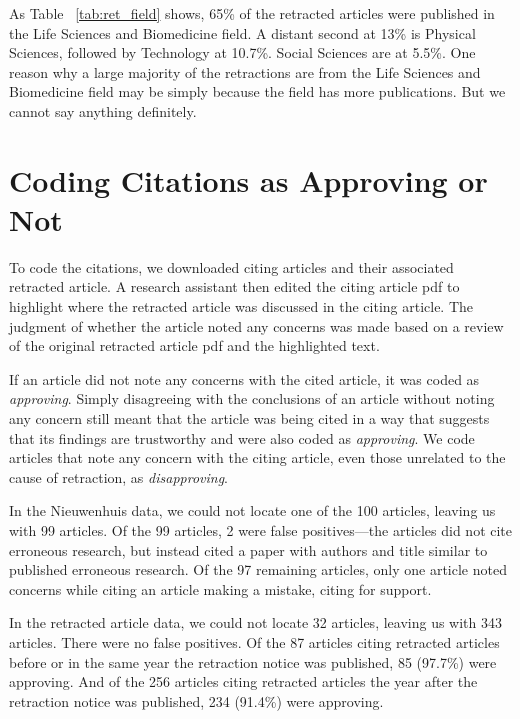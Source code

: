 \documentclass[12pt, letterpaper]{article}
\begin{document}
As Table ~\ref{tab:ret_field} shows, 65\% of the retracted articles were published in the Life Sciences and Biomedicine field.  A distant second at 13\% is Physical Sciences, followed by Technology at 10.7\%. Social Sciences are at 5.5\%.  One reason why a large majority of the retractions are from the  Life Sciences and Biomedicine field may be simply because the field has more publications. But we cannot say anything definitely.



\clearpage
\section{Coding Citations as Approving or Not}
\label{approving_or_not}

To code the citations, we downloaded citing articles and their associated retracted article. A research assistant then edited the citing article pdf to highlight where the retracted article was discussed in the citing article. The judgment of whether the article noted any concerns was made based on a review of the original retracted article pdf and the highlighted text. 

If an article did not note any concerns with the cited article, it was coded as \textit{approving}. Simply disagreeing with the conclusions of an article without noting any concern still meant that the article was being cited in a way that suggests that its findings are trustworthy and were also coded as \textit{approving}. We code articles that note any concern with the citing article, even those unrelated to the cause of retraction, as \textit{disapproving}. 

In the Nieuwenhuis data, we could not locate one of the 100 articles, leaving us with 99 articles. Of the 99 articles, 2 were false positives---the articles did not cite erroneous research, but instead cited a paper with authors and title similar to published erroneous research. Of the 97 remaining articles, only one article noted concerns while citing an article making a mistake, citing \citet{nieuwenhuis2011} for support. 

In the retracted article data, we could not locate 32 articles, leaving us with 343 articles. There were no false positives. Of the 87 articles citing retracted articles before or in the same year the retraction notice was published, 85 (97.7\%) were approving. And of the 256 articles citing retracted articles the year after the retraction notice was published, 234 (91.4\%) were approving.
\end{document}
